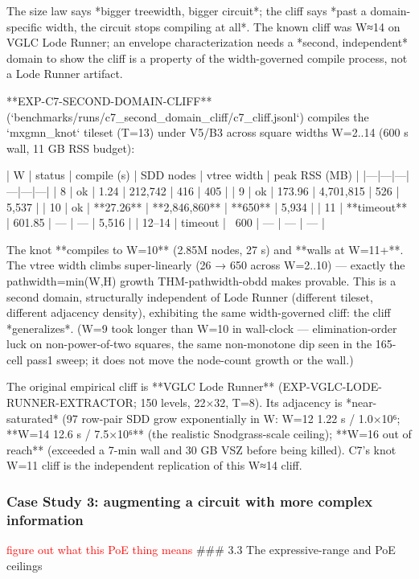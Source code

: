\documentclass[letterpaper]{article} %
\newcommand{\todo}[1]{\textcolor{red}{#1}}
\begin{document}
The size law says *bigger treewidth, bigger circuit*; the cliff says *past a domain-specific width,
the circuit stops compiling at all*. The known cliff was W≈14 on VGLC Lode Runner; an envelope
characterization needs a *second, independent* domain to show the cliff is a property of the
width-governed compile process, not a Lode Runner artifact.

**EXP-C7-SECOND-DOMAIN-CLIFF** (`benchmarks/runs/c7_second_domain_cliff/c7_cliff.jsonl`) compiles the
`mxgmn_knot` tileset (T=13) under V5/B3 across square widths W=2..14 (600 s wall, 11 GB RSS budget):

| W | status | compile (s) | SDD nodes | vtree width | peak RSS (MB) |
|---|---|---|---|---|---|
| 8 | ok | 1.24 | 212,742 | 416 | 405 |
| 9 | ok | 173.96 | 4,701,815 | 526 | 5,537 |
| 10 | ok | **27.26** | **2,846,860** | **650** | 5,934 |
| 11 | **timeout** | 601.85 | — | — | 5,516 |
| 12–14 | timeout | ~600 | — | — | — |

The knot **compiles to W=10** (2.85M nodes, 27 s) and **walls at W=11+**. The vtree width climbs
super-linearly (26 → 650 across W=2..10) — exactly the pathwidth=min(W,H) growth THM-pathwidth-obdd
makes provable. This is a second domain, structurally independent of Lode Runner (different tileset,
different adjacency density), exhibiting the same width-governed cliff: the cliff *generalizes*. (W=9
took longer than W=10 in wall-clock — elimination-order luck on non-power-of-two squares, the same
non-monotone dip seen in the 165-cell pass1 sweep; it does not move the node-count growth or the wall.)

The original empirical cliff is **VGLC Lode Runner** (EXP-VGLC-LODE-RUNNER-EXTRACTOR; 150 levels,
22×32, T=8). Its adjacency is *near-saturated* (97%
row-pair SDD grow exponentially in W: W=12 1.22 s / 1.0×10⁶; **W=14 12.6 s / 7.5×10⁶** (the realistic
Snodgrass-scale ceiling); **W=16 out of reach** (exceeded a 7-min wall and 30 GB VSZ before being
killed). C7's knot W=11 cliff is the independent replication of this W≈14 cliff.

\subsubsection{Case Study 3: augmenting a circuit with more complex information}
\todo{figure out what this PoE thing means}
### 3.3 The expressive-range and PoE ceilings
\end{document}
